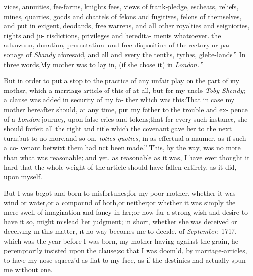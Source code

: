\documentclass{article}
\begin{document}
\lqq vices, annuities, fee-farms, knights\break
\lqq fees, views of frank-pledge, escheats,\break
\lqq reliefs, mines, quarries, goods and\break
\lqq chattels of felons and fugitives, felons\break
\lqq of themselves, and put in exigent,\break
\lqq deodands, free warrens, and all other\break
\lqq royalties and seigniories, rights and ju-\break
\lqq risdictions, privileges and heredita-\break
\lqq ments whatsoever.\tsk {}\hbox{} the\break
\lqq advowson, donation, presentation, and\break
\lqq free disposition of the rectory or par-\break
\lqq sonage of \textit{Shandy} aforesaid, and all and\break
\lqq every the tenths, tythes, glebe-lands\,”\break
\tsh  In three words,\tsh \lqq My mother\break
\lqq was to lay in, (if she chose it) in\break
\lqq \textit{London.}\,”

But in order to put a stop to the practice of any unfair play on
the part of my mother, which a marriage article of this
of at all, but for my uncle \textit{Toby Shandy};\tsk\break 
a clause was added in security of my fa-\break
ther which was this:\tsk \lqq That in case my\break
\lqq mother hereafter should, at any time,\break
\lqq put my father to the trouble and ex-\break
\lqq pence of a \textit{London} journey, upon false\break
\lqq cries and tokens;\tsh  that for every\break
\lqq such instance, she should forfeit all the\break
\lqq right and title which the covenant gave\break
\lqq her to the next turn;\tsh  but to no\break
\lqq more,\tsk  and so on, \textit{toties quoties}, in as\break
\lqq effectual a manner, as if such a co-\break
\lqq venant betwixt them had not been\break
\lqq made.” \tsh This, by the way, was no\break
more than what was reasonable;\tsk
and yet, as reasonable as
it was, I have ever thought it hard that the whole weight of the
article should have fallen entirely, as\break
it did, upon myself.\\
\newpage

But I was begot and born to misfortunes;\tsk  for my poor
mother, whether it was wind or water,\tsk  or a compound of
both,\tsk  or neither;\tsk  or whether it was simply the mere
swell of imagination and fancy in her;\tsk  or how far a strong
wish and desire to have it so, might mislead her judgment;\tsk
in short, whether she was deceived or deceiving in this matter,
it no way becomes me to decide.\break {} of \textit{September}, 1717, which was
the year before I was born, my mother having\break
{} against the grain,\tsk
he peremptorily insisted upon the clause;\tsk so that I was
doom’d, by marriage-articles, to have my nose squeez’d as flat
to my face, as if the destinies had actually spun me without
one.
\end{document}
